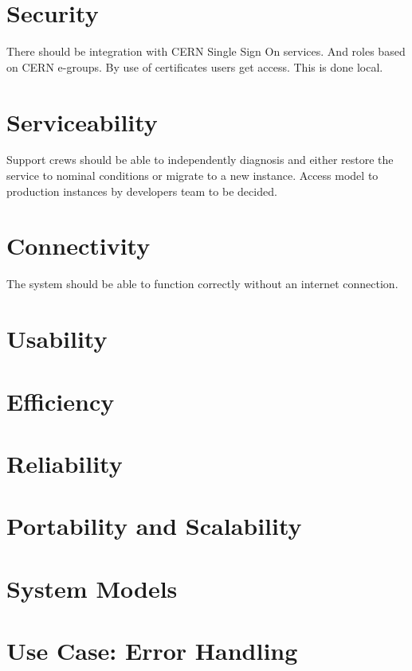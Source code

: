 \documentclass[a4paper,11pt]{book}
\begin{document}
\section{Security}
There should be integration with CERN Single Sign On services. And roles based on CERN e-groups. By use of certificates users get access. This is done local.

\section{Serviceability}
Support crews should be able to independently diagnosis and either restore the service to nominal conditions or migrate to a new instance. Access model to production instances by developers team to be decided.

\section{Connectivity}
The system should be able to function correctly without an internet connection.

\section{Usability}

\section{Efficiency}
\section{Reliability}
\section{Portability and Scalability}
\section{System Models}
\section{Use Case: Error Handling}
\end{document}

